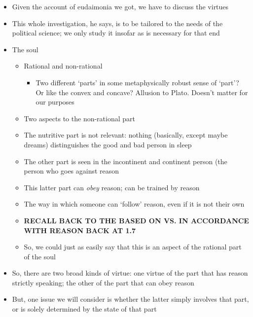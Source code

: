 \documentclass[11pt]{article}
\begin{document}
\begin{itemize}\item{Given the account of eudaimonia we got, we have to discuss the virtues}

\item{This whole investigation, he says, is to be tailored to the needs of the political science; we only study it insofar as is necessary for that end}

\item{The soul}\begin{itemize}\item{Rational and non-rational}\begin{itemize}\item{Two different `parts' in some metaphysically robust sense of `part'? Or like the convex and concave? Allusion to Plato. Doesn't matter for our purposes}\end{itemize}\item{Two aspects to the non-rational part}\item{The nutritive part is not relevant: nothing (basically, except maybe dreams) distinguishes the good and bad person in sleep}\item{The other part is seen in the incontinent and continent person (the person who goes against reason}\item{This latter part can \emph{obey} reason; can be trained by reason}\item{The way in which someone can `follow' reason, even if it is not their own}\item{\textbf{RECALL BACK TO THE BASED ON VS. IN ACCORDANCE WITH REASON BACK AT 1.7}}\item{So, we could just as easily say that this is an aspect of the rational part of the soul}\end{itemize}

\item{So, there are two broad kinds of virtue: one virtue of the part that has reason strictly speaking; the other of the part that can obey reason}\item{But, one issue we will consider is whether the latter simply involves that part, or is solely determined by the state of that part}

\end{itemize}
\end{document}

